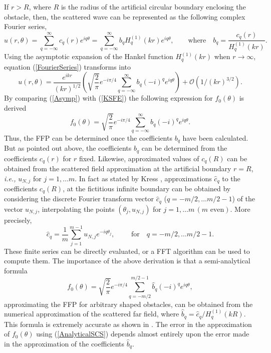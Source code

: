 \documentclass[final,3p,times,12pt]{elsarticle}
\begin{document}
If $r>R$, where $R$ is the
radius of the artificial circular boundary enclosing the
obstacle, then, the scattered wave can be represented as the following complex Fourier series,
\begin{equation}
u(r,\theta)= \sum_{q=-\infty}^{\infty} c_q(r) e^{i
q\theta}=\sum_{q=-\infty}^{\infty} b_q H_q^{(1)}(kr)e^{i q\theta}, \qquad \text{where} \quad b_q=\dfrac{c_q(r)}{H_q^{(1)}(kr)}.
\label{FourierSeries}
\end{equation}
Using the asymptotic
expansion of the Hankel function $H_q^{(1)}(kr)$ when
$r\rightarrow\infty$, equation
(\ref{FourierSeries}) transforms into
\begin{equation}
u(r,\theta) = 
\frac{e^{ikr}}{(kr)^{1/2}}\left(\sqrt{\frac{2}{\pi
}}e^{-i\pi/4}\sum_{q=-\infty}^{\infty} b_q (-i)^q e^{i
q\theta}\right) + \mathcal{O}\left(1/{(kr)^{3/2}}\right). \label{Asymp}
\end{equation}
  By comparing (\ref{Asymp}) with (\ref{KSFE}) the
following expression for $f_0(\theta)$ is derived
\begin{equation}
f_0(\theta)=\sqrt{\frac{2}{\pi}}e^{-i\pi/4}\sum_{q=-\infty}^{\infty} b_q (-i)^q e^{i q\theta}.
\end{equation}
Thus, the FFP can be determined once the coefficients $b_q$
have been calculated. But as pointed out above, the coefficients 
$b_q$ can be determined from the coefficients $c_q(r)$ for $r$ fixed. 
Likewise, approximated
values of $c_q(R)$ can be obtained from the scattered field approximation at the 
artificial boundary
$r=R$, {\it i.e.,} $u_{N,j}$ for $j=1,\dots m$. 
 In fact as stated by Kress \cite{Kress},
 approximations ${\hat
c}_q$ to the coefficients $c_q(R)$, at the fictitious infinite
boundary can be obtained by considering the discrete Fourier
transform vector ${\hat c}_q$ ($q=-m/2 ,\dots m/2 -1$) of the vector $u_{N,j}$, 
 interpolating the points
$\left(\theta_j,u_{N,j}\right)$ for $j=1,\dots
m\, (m\,\, \mbox{even})$. 
 More precisely,
\begin{equation}
{\hat c}_q=\frac{1}{m}\sum_{j=1}^{m-1} u_{N,j}
e^{-i q\theta_j},\qquad\mbox{ for}\quad q=-m/2,\dots m/2-1.
\label{FCoeffs}
\end{equation}
These finite series can be directly evaluated,  or a FFT algorithm
can be used to compute them. The importance of the above
derivation is that  a semi-analytical formula
\begin{equation}
f_0(\theta)=\sqrt{\frac{2}{\pi
}}e^{-i\pi/4}\sum_{q=-m/2}^{m/2-1} {\hat b}_q (-i)^q e^{i
q\theta}, \label{AnalyticalSCS}
\end{equation}
approximating the FFP for arbitrary shaped obstacles, can be
obtained from the numerical approximation of the scattered far
field, where ${\hat b}_q={\hat c}_q/H^{(1)}_q(kR)$. This
formula is extremely accurate as shown in \cite{McKaySIAM}. The
error in the approximation of $f_0(\theta)$ using
(\ref{AnalyticalSCS}) depends almost entirely upon the error made
in the approximation of the coefficients ${\hat b}_q$.
\end{document}
